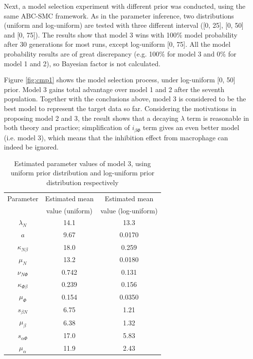 
Next, a model selection experiment with different prior was conducted, using the same ABC-SMC framework. As in the parameter inference, two distributions (uniform and log-uniform) are tested with three different interval ([0, 25], [0, 50] and [0, 75]). The results show that model 3 wins with 100\% model probability after 30 generations for most runs, except log-uniform [0, 75]. All the model probability results are of great discrepancy (e.g. 100\% for model 3 and 0\% for model 1 and 2), so Bayesian factor is not calculated.

Figure \ref{fig:cmp1} shows the model selection process, under log-uniform [0, 50] prior. Model 3 gains total advantage over model 1 and 2 after the seventh population. Together with the conclusions above, model 3 is considered to be the best model to represent the target data so far. Considering the motivations in proposing model 2 and 3, the result shows that a decaying $\lambda$ term is reasonable in both theory and practice; simplification of $i_{\beta\Phi}$ term gives an even better model (i.e. model 3), which means that the inhibition effect from macrophage can indeed be ignored.

\begin{table}[t!]
    \centering
    \begin{tabular}{|c c c|}
        \hline
        Parameter            & Estimated mean  & Estimated mean      \\
                             & value (uniform) & value (log-uniform) \\[0.5ex]
        \hline\hline
        $\lambda_N$          & 14.1            & 13.3                \\
        $a$                  & 9.67            & 0.0170              \\
        $\kappa_{N\beta}$    & 18.0            & 0.259               \\
        $\mu_N$              & 13.2            & 0.0180              \\
        $\nu_{N\Phi}$        & 0.742           & 0.131               \\
        \hline
        $\kappa_{\Phi\beta}$ & 0.239           & 0.156               \\
        $\mu_\Phi$           & 0.154           & 0.0350              \\
        \hline
        $s_{\beta N}$        & 6.75            & 1.21                \\
        $\mu_\beta$          & 6.38            & 1.32                \\
        \hline
        $s_{\alpha\Phi}$     & 17.0            & 5.83                \\
        $\mu_\alpha$         & 11.9            & 2.43                \\
        \hline
    \end{tabular}
    \caption[Estimated parameter values of model 3]
    {Estimated parameter values of model 3, using uniform prior distribution and log-uniform prior distribution respectively}
    \label{table:estimated1}
\end{table}

